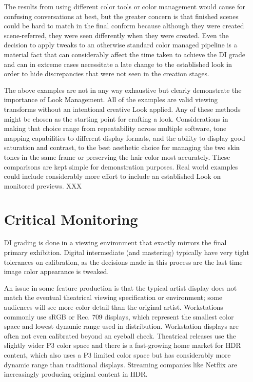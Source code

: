 The results from using different color tools or color management would cause for confusing conversations at best, but the greater concern is that finished scenes could be hard to match in the final conform because although they were created scene-referred, they were seen differently when they were created. Even the decision to apply tweaks to an otherwise standard color managed pipeline is a material fact that can considerably affect the time taken to achieve the DI grade and can in extreme cases necessitate a late change to the established look in order to hide discrepancies that were not seen in the creation stages. 

The above examples are not in any way exhaustive but clearly demonstrate the importance of Look Management. All of the examples are valid viewing transforms without an intentional creative Look applied. Any of these methods might be chosen as the starting point for crafting a look. Considerations in making that choice range from repeatability across multiple software, tone mapping capabilities to different display formats, and the ability to display good saturation and contrast, to the best aesthetic choice for managing the two skin tones in the same frame or preserving the hair color most accurately. These comparisons are kept simple for demonstration purposes. Real world examples could include considerably more effort to include an established Look on monitored previews.
XXX

\section{Critical Monitoring}

DI grading is done in a viewing environment that exactly mirrors the final primary exhibition. Digital intermediate (and mastering) typically have very tight tolerances on calibration, as the decisions made in this process are the last time image color appearance is tweaked.

An issue in some feature production is that the typical artist display does not match the eventual theatrical viewing specification or environment; some audiences will see more color detail than the original artist. Workstations commonly use sRGB or Rec. 709 displays, which represent the smallest color space and lowest dynamic range used in distribution. Workstation displays are often not even calibrated beyond an eyeball check. Theatrical releases use the slightly wider P3 color space and there is a fast-growing home market for HDR content, which also uses a P3 limited color space but has considerably more dynamic range than traditional displays. Streaming companies like Netflix are increasingly producing original content in HDR.

